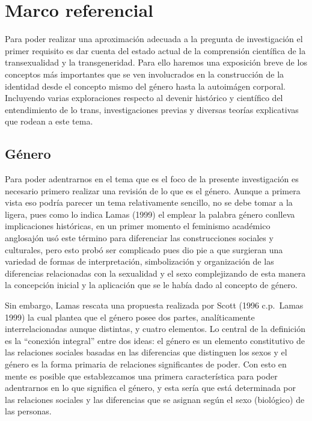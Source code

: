 \chapter{Marco referencial}\label{ch:marcoreferencial}
Para poder realizar una aproximación adecuada a la pregunta de investigación
el primer requisito es dar cuenta del estado actual de la comprensión
científica de la transexualidad y la transgeneridad.
Para ello haremos una exposición breve de los conceptos más importantes que
se ven involucrados en la construcción de la identidad desde el concepto
mismo del género hasta la autoimágen corporal.
Incluyendo varias exploraciones respecto al devenir histórico y científico
del entendimiento de lo trans, investigaciones previas y diversas teorías
explicativas que rodean a este tema.

\section{Género}

Para poder adentrarnos en el tema que es el foco de la presente investigación es
necesario primero realizar una revisión de lo que es el género.
Aunque a primera vista eso podría parecer un tema relativamente sencillo, no se
debe tomar a la ligera, pues como lo indica Lamas (1999) el emplear la palabra
género conlleva implicaciones históricas, en un primer momento el feminismo
académico anglosajón usó este término para diferenciar las construcciones
sociales y culturales, pero esto probó ser complicado pues dio pie a que
surgieran una variedad de formas de interpretación, simbolización y organización
de las diferencias relacionadas con la sexualidad y el sexo complejizando de
esta manera la concepción inicial y la aplicación que se le había dado al
concepto de género.

Sin embargo, Lamas rescata una propuesta realizada por Scott (1996 c.p.~Lamas
1999) la cual plantea que el género posee dos
partes, analíticamente interrelacionadas aunque distintas, y cuatro elementos.
Lo central de la definición es la “conexión integral” entre dos ideas: el género
es un elemento constitutivo de las relaciones sociales basadas en las
diferencias que distinguen los sexos y el género es la forma primaria de
relaciones significantes de poder.
Con esto en mente es posible que establezcamos una primera característica para
poder adentrarnos en lo que significa el género, y esta sería que está
determinada por las relaciones sociales y las diferencias que se asignan según
el sexo (biológico) de las personas.

